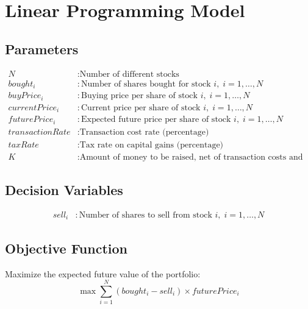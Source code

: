 \documentclass{article}
\begin{document}
\section*{Linear Programming Model}

\subsection*{Parameters}
\begin{align*}
N &: \text{Number of different stocks} \\
bought_i &: \text{Number of shares bought for stock } i, \; i = 1, \ldots, N \\
buyPrice_i &: \text{Buying price per share of stock } i, \; i = 1, \ldots, N \\
currentPrice_i &: \text{Current price per share of stock } i, \; i = 1, \ldots, N \\
futurePrice_i &: \text{Expected future price per share of stock } i, \; i = 1, \ldots, N \\
transactionRate &: \text{Transaction cost rate (percentage)} \\
taxRate &: \text{Tax rate on capital gains (percentage)} \\
K &: \text{Amount of money to be raised, net of transaction costs and taxes}
\end{align*}

\subsection*{Decision Variables}
\begin{align*}
sell_i &: \text{Number of shares to sell from stock } i, \; i = 1, \ldots, N
\end{align*}

\subsection*{Objective Function}
Maximize the expected future value of the portfolio:
\[
\max \sum_{i=1}^{N} (bought_i - sell_i) \times futurePrice_i
\]
\end{document}

